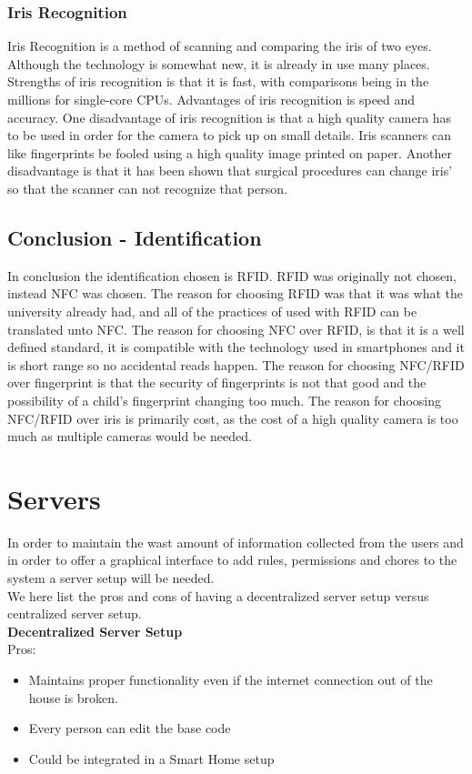 \subsubsection{Iris Recognition}
Iris Recognition is a method of scanning and comparing the iris of two eyes. Although the technology is somewhat new, it is already in use many places. Strengths of iris recognition is that it is fast, with comparisons being in the millions for single-core CPUs. Advantages of iris recognition is speed and accuracy. One disadvantage of iris recognition is that a high quality camera has to be used in order for the camera to pick up on small details. Iris scanners can like fingerprints be fooled using a high quality image printed on paper. Another disadvantage is that it has been shown that surgical procedures can change iris' so that the scanner can not recognize that person.

\subsection{Conclusion - Identification}
In conclusion the identification chosen is RFID. RFID was originally not chosen, instead NFC was chosen. The reason for choosing RFID was that it was what the university already had, and all of the practices of used with RFID can be translated unto NFC. The reason for choosing NFC over RFID, is that it is a well defined standard, it is compatible with the technology used in smartphones and it is short range so no accidental reads happen. The reason for choosing NFC/RFID over fingerprint is that the security of fingerprints is not that good and the possibility of a child's fingerprint changing too much. The reason for choosing NFC/RFID over iris is primarily cost, as the cost of a high quality camera is too much as multiple cameras would be needed.

\section{Servers}
In order to maintain the wast amount of information collected from the users and in order to offer a graphical interface to add rules, permissions and chores to the system a server setup will be needed.\\
We here list the pros and cons of having a decentralized server setup versus centralized server setup.\\

\textbf{Decentralized Server Setup}\\
Pros:
\begin{itemize}
	\item Maintains proper functionality even if the internet connection out of the house is broken.
  \item Every person can edit the base code
  \item Could be integrated in a Smart Home setup
\end{itemize}

